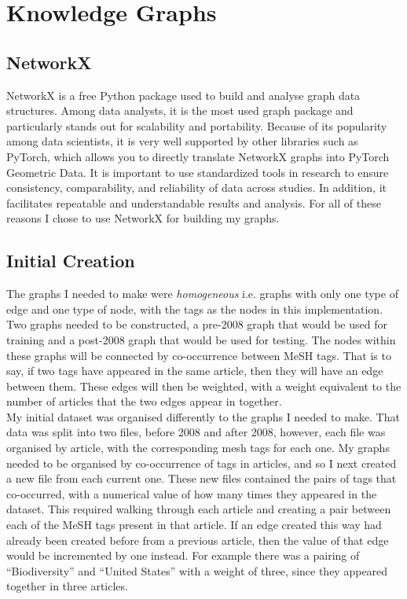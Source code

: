 \documentclass{l4proj}
\begin{document}
\section{Knowledge Graphs}

\subsection{NetworkX}

NetworkX is a free Python package used to build and analyse graph data structures. Among data analysts, it is the most used graph package and particularly stands out for scalability and portability. Because of its popularity among data scientists, it is very well supported by other libraries such as PyTorch, which allows you to directly translate NetworkX graphs into PyTorch Geometric Data. It is important to use standardized tools in research to ensure consistency, comparability, and reliability of data across studies. In addition, it  facilitates repeatable and understandable results and analysis. For all of these reasons I chose to use NetworkX for building my graphs. \\

\subsection{Initial Creation}

The graphs I needed to make were \textit{homogeneous} i.e. graphs with only one type of edge and one type of node, with the tags as the nodes in this implementation. Two graphs needed to be constructed, a pre-2008 graph that would be used for training and a post-2008 graph that would be used for testing. The nodes within these graphs will be connected by co-occurrence between MeSH tags. That is to say, if two tags have appeared in the same article, then they will have an edge between them. These edges will then be weighted, with a weight equivalent to the number of articles that the two edges appear in together. \\

My initial dataset was organised differently to the graphs I needed to make. That  data was split into two files, before 2008 and after 2008, however, each file was organised by article, with the corresponding mesh tags for each one. My graphs needed to be organised by co-occurrence of tags in articles, and so I next created a new file from each current one. These new files contained the pairs of tags that co-occurred, with a numerical value of how many times they appeared in the dataset. This required walking through each article and creating a pair between each of the MeSH tags present in that article. If an edge created this way had already been created before from a previous article, then the value of that edge would be incremented by one instead. For example there was a pairing of ``Biodiversity'' and ``United States'' with a weight of three, since they appeared together in three articles. \\
\end{document}
